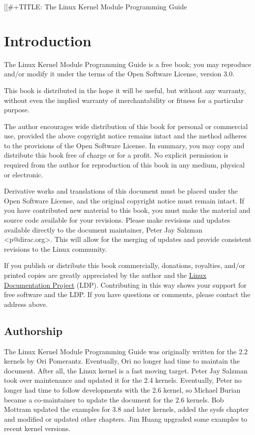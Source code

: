 \documentclass[11pt]{article}
\author{Peter Jay Salzman, Michael Burian, Ori Pomerantz, Bob Mottram, Jim Huang}
\date{\today}
\title{}
\begin{document}
\tableofcontents

[[\#+TITLE: The Linux Kernel Module Programming Guide


\section{Introduction}
\label{sec:org8149562}
The Linux Kernel Module Programming Guide is a free book; you may reproduce and/or modify it under the terms of the Open Software License, version 3.0.

This book is distributed in the hope it will be useful, but without any warranty, without even the implied warranty of merchantability or fitness for a particular purpose.

The author encourages wide distribution of this book for personal or commercial use, provided the above copyright notice remains intact and the method adheres to the provisions of the Open Software License. In summary, you may copy and distribute this book free of charge or for a profit. No explicit permission is required from the author for reproduction of this book in any medium, physical or electronic.

Derivative works and translations of this document must be placed under the Open Software License, and the original copyright notice must remain intact. If you have contributed new material to this book, you must make the material and source code available for your revisions. Please make revisions and updates available directly to the document maintainer, Peter Jay Salzman <p@dirac.org>. This will allow for the merging of updates and provide consistent revisions to the Linux community.

If you publish or distribute this book commercially, donations, royalties, and/or printed copies are greatly appreciated by the author and the \href{http://www.tldp.org}{Linux Documentation Project} (LDP). Contributing in this way shows your support for free software and the LDP. If you have questions or comments, please contact the address above.

\subsection{Authorship}
\label{sec:orgfe93781}

The Linux Kernel Module Programming Guide was originally written for the 2.2 kernels by Ori Pomerantz. Eventually, Ori no longer had time to maintain the document. After all, the Linux kernel is a fast moving target. Peter Jay Salzman took over maintenance and updated it for the 2.4 kernels. Eventually, Peter no longer had time to follow developments with the 2.6 kernel, so Michael Burian became a co-maintainer to update the document for the 2.6 kernels.  Bob Mottram updated the examples for 3.8 and later kernels, added the sysfs chapter and modified or updated other chapters. Jim Huang upgraded some examples to recent kernel versions.
\end{document}
